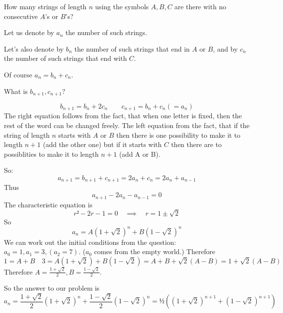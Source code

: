 \documentclass[english]{lbscript}
\begin{document}
\begin{example}{}{}
  How many strings of length \(n\) using the symbols \(A, B, C\) are there with no consecutive \(A\)'s or \(B\)'s?

  Let us denote by \(a_n\) the number of such strings.

  Let's also denote by \(b_n\) the number of such strings that end in \(A\) or \(B\), and by \(c_n\) the number of such strings that end with \(C\).

  Of course \(a_n=b_n+c_n\).

  What is \(b_{n+1}, c_{n+1}\)?


  \begin{equation}
    \label{eq:82}
    b_{n+1}= b_n + 2c_n  \quad \quad c_{n+1} = b_n + c_n (=a_n)
  \end{equation}
  The right equation follows from the fact, that when one letter is fixed, then the rest of the word can be changed freely. The left equation from the fact, that if the string of length \(n\) starts with \(A\) or \(B\) then there is one possibility to make it to length \(n+1\) (add the other one) but if it starts with \(C\) then there are to possiblities to make it to length \(n+1\) (add A or B).

  So:
  \begin{equation}
    \label{eq:88}
    a_{n+1}= b_{n+1}+c_{n+1} = 2a_n+c_n = 2a_n+a_{n-1}
  \end{equation}
  Thus
  \begin{equation}
    \label{eq:89}
    a_{n+1} - 2a_n - a_{n-1} = 0
  \end{equation}
  The characteristic equation is
  \begin{equation}
    \label{eq:90}
    r²-2r -1 = 0 \quad ⟹ \quad  r = 1±\sqrt{2}
  \end{equation}
  So
  \begin{equation}
    \label{eq:91}
    a_{n} = A(1+\sqrt{2})^{n} + B(1-\sqrt{2})^{n}
  \end{equation}
  We can work out the initial conditions from the question: \(a_0=1, a_1=3, (a_2=7)\). (\(a_0\) comes from the empty world.)
  Therefore
  \begin{equation}
    \label{eq:92}
    1=A+B\quad 3=A(1+\sqrt{2}) + B(1-\sqrt{2})= A+B + \sqrt{2}(A-B) = 1 + \sqrt{2}(A-B)
  \end{equation}
  Therefore \(A= \frac{1+\sqrt{2}}{2}, B= \frac{1-\sqrt{2}}{2}\).

  So the answer to our problem is
  \begin{equation}
    \label{eq:93}
    a_n= \frac{1+\sqrt{2}}{2}\left(1+\sqrt{2} \right)^{n} + \frac{1-\sqrt{2}}{2} \left(1-\sqrt{2} \right)^{n}= ½\left( \left(1+\sqrt{2} \right)^{n+1} + \left(1-\sqrt{2} \right)^{n+1}  \right)
  \end{equation}
\end{example}
\end{document}
